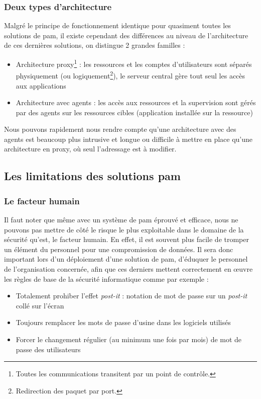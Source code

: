 \subsubsection{Deux types d'architecture}
Malgré le principe de fonctionnement identique pour quasiment toutes les solutions de \gls{pam}, il existe cependant des différences au niveau de l'architecture de ces dernières solutions, on distingue 2 grandes familles :
\begin{itemize}
	\item Architecture proxy\footnote{Toutes les communications transitent par un point de contrôle.} : les ressources et les comptes d'utilisateurs sont séparés physiquement (ou logiquement\footnote{Redirection des paquet  par port.}), le serveur central gère tout seul les accès aux applications
	\item Architecture avec agents : les accès aux ressources et la supervision sont gérés par des agents sur les ressources cibles (application installée sur la ressource)
\end{itemize}
Nous pouvons rapidement nous rendre compte qu'une architecture avec des agents est beaucoup plus intrusive et longue ou difficile à mettre en place qu'une architecture en proxy, où seul l'adressage est à modifier.

\subsection{Les limitations des solutions \gls{pam}}

\subsubsection{Le facteur humain} Il faut noter que même avec un système de \gls{pam} éprouvé et efficace, nous ne pouvons pas mettre de côté le risque le plus exploitable dans le domaine de la sécurité qu'est, le facteur humain. En effet, il est souvent plus facile de tromper un élément du personnel pour une compromission de données. Il sera donc important lors d'un déploiement d'une solution de \gls{pam}, d'éduquer le personnel de l'organisation concernée, afin que ces derniers mettent correctement en œuvre les règles de base de la sécurité informatique comme par exemple :
\begin{itemize}
	\item Totalement prohiber \og l'effet \textit{post-it} \fg{} : notation de mot de passe sur un \textit{post-it} collé sur l'écran
	\item Toujours remplacer les mots de passe d'usine dans les logiciels utilisés
	\item Forcer le changement régulier (au minimum une fois par mois) de mot de passe des utilisateurs
\end{itemize}


